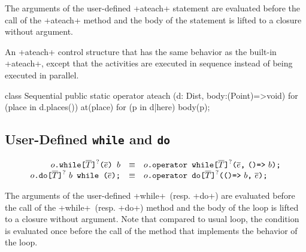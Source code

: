 The arguments of the user-defined \xcd+ateach+ statement are
evaluated before the call of the \xcd+ateach+ method and the body of
the statement is lifted to a closure without argument.

\begin{ex}
  An \xcd+ateach+ control structure that has the same behavior as the
  built-in \xcd+ateach+, except that the activities are executed in
  sequence instead of being executed in parallel.

\begin{xten}
class Sequential {
  public static operator ateach (d: Dist, body:(Point)=>void) {
    for (place in d.places()) {
      at(place) {
        for (p in d|here) { body(p); }
      }
    }
  }
}
\end{xten}
%
\end{ex}

\subsection{User-Defined \texttt{while} and \texttt{do}}


$$
\begin{array}{rcl}
  \usrWhile{o}{\overline{T}}{\overline{e}}{b}
  & \equiv &
  \libWhile{o}{\overline{T}}{\overline{e}}{b}
  \\

  \usrDo{o}{\overline{T}}{b}{\overline{e}}
  & \equiv &
  \libDo{o}{\overline{T}}{b}{\overline{e}}
\end{array}
$$

The arguments of the user-defined \xcd+while+~(resp. \xcd+do+) are
evaluated before the call of the \xcd+while+~(resp. \xcd+do+) method
and the body of the loop is lifted to a closure without argument.
%
Note that compared to usual loop, the condition is evaluated once
before the call of the method that implements the behavior of the
loop.


